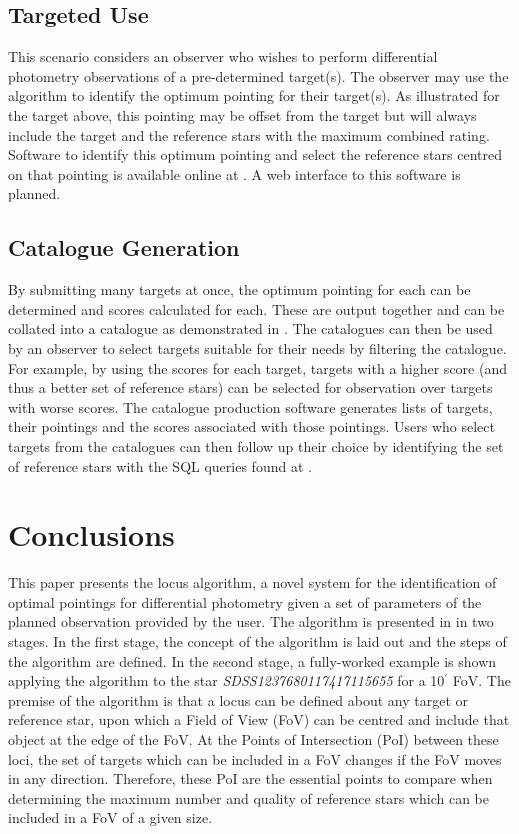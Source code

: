 \documentclass{aa}
\begin{document}
\subsection{Targeted Use}
This scenario considers an observer who wishes to perform differential photometry observations of a pre-determined target(s).  The observer may use the algorithm to identify the optimum pointing for their target(s).  As illustrated for the target above, this pointing may be offset from the target but will always include the target and the reference stars with the maximum combined rating.  Software to identify this optimum pointing and select the reference stars centred on that pointing is available online at \citet{githubrepo}.  A web interface to this software is planned. 

\subsection{Catalogue Generation}
By submitting many targets at once, the optimum pointing for each can be determined and scores calculated for each.  These are output together and can be collated into a catalogue as demonstrated in \citet{quasarpaper}. The catalogues can then be used by an observer to select targets suitable for their needs by filtering the catalogue. For example, by using the scores for each target, targets with a higher score (and thus a better set of reference stars) can be selected for observation over targets with worse scores.  The catalogue production software generates lists of targets, their pointings and the scores associated with those pointings.  Users who select targets from the catalogues can then follow up their choice by identifying the set of reference stars with the SQL queries found at \citet{githubrepo}.

\section{Conclusions}
\label{Conclusions}

This paper presents the locus algorithm, a novel system for the identification of optimal pointings for differential photometry given a set of parameters of the planned observation provided by the user. The algorithm is presented in in two stages. In the first stage, the concept of the algorithm is laid out and the steps of the algorithm are defined. In the second stage, a fully-worked example is shown applying the algorithm to the star \textit{SDSS1237680117417115655} for a 10$^\prime$ FoV. The premise of the algorithm is that a locus can be defined about any target or reference star, upon which a Field of View (FoV) can be centred and include that object at the edge of the FoV. At the Points of Intersection (PoI) between these loci, the set of targets which can be included in a FoV changes if the FoV moves in any direction. Therefore, these PoI are the essential points to compare when
determining the maximum number and quality of reference stars which can be included in a FoV of a given size.
\end{document}
